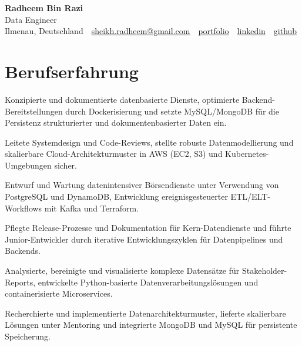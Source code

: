 \documentclass[11pt,a4paper]{resume}
\makeatletter
\newcommand{\Portfolio}{https://radheem.github.io/my-cv}
\newcommand{\PortfolioText}{portfolio}
\newcommand{\GitHub}{https://github.com/radheem}
\newcommand{\LinkedIn}{https://www.linkedin.com/in/radheem-razi}
\newcommand{\Email}{sheikh.radheem@gmail.com}
\makeatother
\begin{document}
\clearpage
{}

\begin{center}
  {\huge\bfseries Radheem Bin Razi}\\[3pt]
  {\large Data Engineer}\\[6pt]
  \small
  Ilmenau, Deutschland \,\textbar\,
  \href{mailto:\Email}{\Email} \,\textbar\,
  \href{\Portfolio}{\PortfolioText} \,\textbar\,
  \href{\LinkedIn}{linkedin} \,\textbar\,
  \href{\GitHub}{github}
\end{center}
\vspace{2pt}

\section{Berufserfahrung}

\bullets
  \item Konzipierte und dokumentierte datenbasierte Dienste, optimierte Backend-Bereitstellungen durch Dockerisierung und setzte MySQL/MongoDB für die Persistenz strukturierter und dokumentenbasierter Daten ein.
  \item Leitete Systemdesign und Code-Reviews, stellte robuste Datenmodellierung und skalierbare Cloud-Architekturmuster in AWS (EC2, S3) und Kubernetes-Umgebungen sicher.
\bulletsend
\vspace{3pt}
\bullets
  \item Entwurf und Wartung datenintensiver Börsendienste unter Verwendung von PostgreSQL und DynamoDB, Entwicklung ereignisgesteuerter ETL/ELT-Workflows mit Kafka und Terraform.
  \item Pflegte Release-Prozesse und Dokumentation für Kern-Datendienste und führte Junior-Entwickler durch iterative Entwicklungszyklen für Datenpipelines und Backends.
\bulletsend
\vspace{3pt}
\bullets
  \item Analysierte, bereinigte und visualisierte komplexe Datensätze für Stakeholder-Reports, entwickelte Python-basierte Datenverarbeitungslösungen und containerisierte Microservices.
  \item Recherchierte und implementierte Datenarchitekturmuster, lieferte skalierbare Lösungen unter Mentoring und integrierte MongoDB und MySQL für persistente Speicherung.
\bulletsend
\vspace{3pt}
\end{document}
